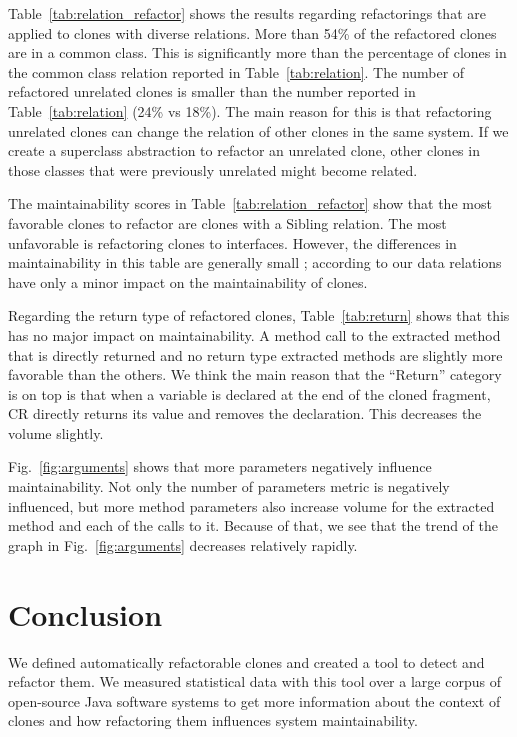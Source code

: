 \documentclass[sigconf,review,anonymous]{acmart}
\begin{document}
Table~\ref{tab:relation_refactor} shows the results regarding refactorings that are applied to clones with diverse relations. More than 54\% of the refactored clones are in a common class. This is significantly more than the percentage of clones in the common class relation reported in Table~\ref{tab:relation}. The number of refactored unrelated clones is smaller than the number reported in Table~\ref{tab:relation} (24\% vs 18\%). The main reason for this is that refactoring unrelated clones can change the relation of other clones in the same system. If we create a superclass abstraction to refactor an unrelated clone, other clones in those classes that were previously unrelated might become related.

The maintainability scores in Table~\ref{tab:relation_refactor} show that the most favorable clones to refactor are clones with a Sibling relation. The most unfavorable is refactoring clones to interfaces. However, the differences in maintainability in this table are generally small %
; according to our data relations have only a minor impact on the maintainability of clones.

Regarding the return type of refactored clones, Table~\ref{tab:return} shows that this has no major impact on maintainability. A method call to the extracted method that is directly returned and no return type extracted methods are slightly more favorable than the others. We think the main reason that the ``Return'' category is on top is that when a variable is declared at the end of the cloned fragment, CR directly returns its value and removes the declaration. This decreases the volume slightly.

Fig.~\ref{fig:arguments} shows that more parameters negatively influence maintainability. Not only the %
number of parameters metric is negatively influenced, but more method parameters also increase volume for the extracted method and each of the calls to it. Because of that, we see that the trend of the graph in Fig.~\ref{fig:arguments} decreases relatively rapidly.

\section{Conclusion} \label{sec:conclusion}
We defined automatically refactorable clones and created a tool to detect and refactor them. We measured statistical data with this tool over a large corpus of open-source Java software systems to get more information about the context of clones and how refactoring them influences system maintainability.
\end{document}
